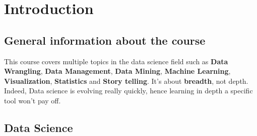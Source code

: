 \documentclass[a4paper,11pt,twoside]{article}
\begin{document}
\begin{titlepage}
\begin{center}



%
\vfill %

\end{center}
\end{titlepage}



\pagestyle{fancy}
\newpage
\tableofcontents 

\baselineskip=16pt

\newpage




\section{Introduction}

\subsection{General information about the course}

This course covers multiple topics in the data science field such as \textbf{Data Wrangling}, {\bf Data Management}, {\bf Data Mining}, {\bf Machine Learning}, {\bf Visualization}, {\bf Statistics} and {\bf Story telling}. It's about {\bf breadth}, not depth. Indeed, Data science is evolving really quickly, hence learning in depth a specific tool won't pay off. 

\subsection{Data Science}
\end{document}
